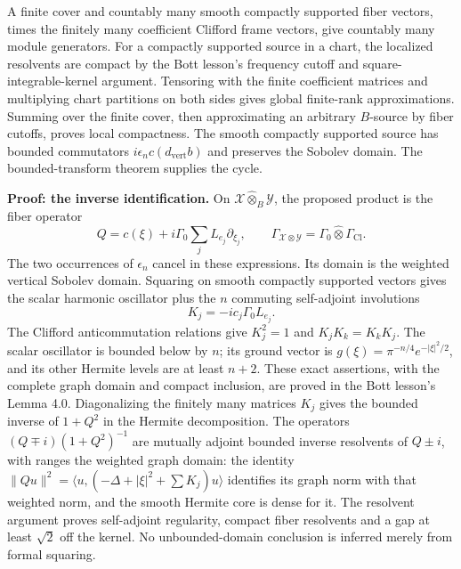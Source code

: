 \documentclass[
  11pt,
]{article}
\begin{document}
A finite cover and countably many smooth compactly supported fiber
vectors, times the finitely many coefficient Clifford frame vectors,
give countably many module generators. For a compactly supported source
in a chart, the localized resolvents are compact by the Bott lesson's
frequency cutoff and square-integrable-kernel argument. Tensoring with
the finite coefficient matrices and multiplying chart partitions on both
sides gives global finite-rank approximations. Summing over the finite
cover, then approximating an arbitrary \(B\)-source by fiber cutoffs,
proves local compactness. The smooth compactly supported source has
bounded commutators \(i\epsilon_n c(d_{\mathrm{vert}}b)\) and preserves
the Sobolev domain. The bounded-transform theorem supplies the cycle.

\textbf{Proof: the inverse identification.} On
\(\mathcal X\widehat\otimes_B\mathcal Y\), the proposed product is the
fiber operator \[
 Q=c(\xi)+i\Gamma_0\sum_j L_{e_j}\partial_{\xi_j},
 \qquad
 \Gamma_{\mathcal X\otimes\mathcal Y}
       =\Gamma_0\widehat\otimes\Gamma_{\operatorname{Cl}} .
 \tag{CI.22}
\] The two occurrences of \(\epsilon_n\) cancel in these expressions.
Its domain is the weighted vertical Sobolev domain. Squaring on smooth
compactly supported vectors gives the scalar harmonic oscillator plus
the \(n\) commuting self-adjoint involutions \[
 K_j=-i c_j\Gamma_0 L_{e_j}.
 \tag{CI.23}
\] The Clifford anticommutation relations give \(K_j^2=1\) and
\(K_jK_k=K_kK_j\). The scalar oscillator is bounded below by \(n\); its
ground vector is \(g(\xi)=\pi^{-n/4}e^{-|\xi|^2/2}\), and its other
Hermite levels are at least \(n+2\). These exact assertions, with the
complete graph domain and compact inclusion, are proved in the Bott
lesson's Lemma 4.0. Diagonalizing the finitely many matrices \(K_j\)
gives the bounded inverse of \(1+Q^2\) in the Hermite decomposition. The
operators \((Q\mp i)(1+Q^2)^{-1}\) are mutually adjoint bounded inverse
resolvents of \(Q\pm i\), with ranges the weighted graph domain: the
identity \(\|Qu\|^2=\langle u,(-\Delta+|\xi|^2+\sum K_j)u\rangle\)
identifies its graph norm with that weighted norm, and the smooth
Hermite core is dense for it. The resolvent argument proves self-adjoint
regularity, compact fiber resolvents and a gap at least \(\sqrt2\) off
the kernel. No unbounded-domain conclusion is inferred merely from
formal squaring.
\end{document}
